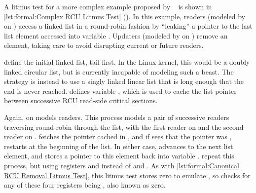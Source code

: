 \begin{fcvref}
A litmus test for a more complex example proposed by
~\cite{RomanPenyaev2018rrRCU} is shown in
\cref{lst:formal:Complex RCU Litmus Test}
().
In this example, readers (modeled by  on
) access a linked list
in a round-robin fashion by ``leaking'' a pointer to the last
list element accessed into variable .
Updaters (modeled by  on )
remove an element, taking care to avoid disrupting current or future
readers.

\QuickQuizEnd

 define the initial linked
list, tail first.
In the Linux kernel, this would be a doubly linked circular list,
but  is currently incapable of modeling such a beast.
The strategy is instead to use a singly linked linear list that
is long enough that the end is never reached.
 defines variable , which is used to
cache the list pointer between successive RCU read-side critical
sections.

Again,  on  models readers.
This process models a pair of successive readers traversing round-robin
through the list, with the first reader on 
and the second reader on .
 fetches the pointer cached in , and if
 sees that the pointer was ,
 restarts at the beginning of the list.
In either case,  advances to the next list element,
and  stores a pointer to this element back into
variable .
 repeat this process, but using
registers  and  instead of  and .
As with
\cref{lst:formal:Canonical RCU Removal Litmus Test},
this litmus test stores zero to emulate , so
 checks for any of these four registers being
, also known as zero.


\end{fcvref}
